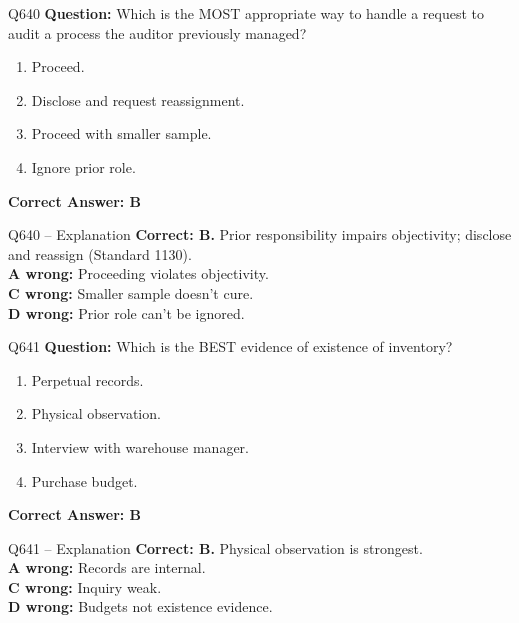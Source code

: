 \documentclass[aspectratio=169,10pt]{beamer}
\begin{document}
	\begin{frame}[t]{Q640}
		\small
		\textbf{Question:} Which is the MOST appropriate way to handle a request to audit a process the auditor previously managed?
		\begin{enumerate}[label=\Alph*.,itemsep=1pt,topsep=2pt]
			\item Proceed.
			\item Disclose and request reassignment.
			\item Proceed with smaller sample.
			\item Ignore prior role.
		\end{enumerate}
		\vspace{4pt}
		\textbf{Correct Answer: B}
	\end{frame}
	
	\begin{frame}[t]{Q640 -- Explanation}
		\small
		\textbf{Correct: B.} Prior responsibility impairs objectivity; disclose and reassign (Standard 1130). \\[4pt]
		\textbf{A wrong:} Proceeding violates objectivity. \\[2pt]
		\textbf{C wrong:} Smaller sample doesn't cure. \\[2pt]
		\textbf{D wrong:} Prior role can't be ignored.
	\end{frame}
	
	\begin{frame}[t]{Q641}
		\small
		\textbf{Question:} Which is the BEST evidence of existence of inventory?
		\begin{enumerate}[label=\Alph*.,itemsep=1pt,topsep=2pt]
			\item Perpetual records.
			\item Physical observation.
			\item Interview with warehouse manager.
			\item Purchase budget.
		\end{enumerate}
		\vspace{4pt}
		\textbf{Correct Answer: B}
	\end{frame}
	
	\begin{frame}[t]{Q641 -- Explanation}
		\small
		\textbf{Correct: B.} Physical observation is strongest. \\[4pt]
		\textbf{A wrong:} Records are internal. \\[2pt]
		\textbf{C wrong:} Inquiry weak. \\[2pt]
		\textbf{D wrong:} Budgets not existence evidence.
	\end{frame}
	
\end{document}
